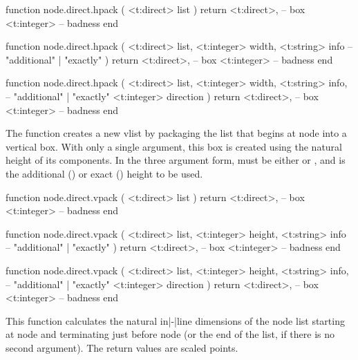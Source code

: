\starttyping[option=LUA]
function node.direct.hpack (
    <t:direct> list
)
    return
        <t:direct>, -- box
        <t:integer> -- badness
end

function node.direct.hpack (
    <t:direct>  list,
    <t:integer> width,
    <t:string>  info -- "additional" | "exactly"
)
    return
        <t:direct>, -- box
        <t:integer> -- badness
end

function node.direct.hpack (
    <t:direct>  list,
    <t:integer> width,
    <t:string>  info, -- "additional" | "exactly"
    <t:integer> direction
)
    return
        <t:direct>, -- box
        <t:integer> -- badness
end
\stoptyping


The  function creates a new vlist by packaging the list that begins
at node  into a vertical box. With only a single argument, this box is
created using the natural height of its components. In the three argument form,
 must be either  or , and 
is the additional () or exact () height to be
used.

\starttyping[option=LUA]
function node.direct.vpack (
    <t:direct> list
)
    return
        <t:direct>, -- box
        <t:integer> -- badness
end

function node.direct.vpack (
    <t:direct>  list,
    <t:integer> height,
    <t:string>  info -- "additional" | "exactly"
)
    return
        <t:direct>, -- box
        <t:integer> -- badness
end

function node.direct.vpack (
    <t:direct>  list,
    <t:integer> height,
    <t:string>  info, -- "additional" | "exactly"
    <t:integer> direction
)
    return
        <t:direct>, -- box
        <t:integer> -- badness
end
\stoptyping

This function calculates the natural in|-|line dimensions of the node list starting
at node  and terminating just before node  (or the end of the
list, if there is no second argument). The return values are scaled points.

